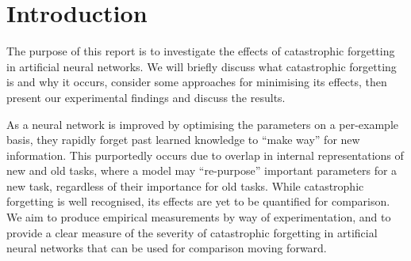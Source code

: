 \documentclass{report}
\begin{document}
	\section{Introduction}
	The purpose of this report is to investigate the effects of catastrophic forgetting in artificial neural networks. We will briefly discuss what catastrophic forgetting is and why it occurs, consider some approaches for minimising its effects, then present our experimental findings and discuss the results. \par \par
	As a neural network is improved by optimising the parameters on a per-example basis, they rapidly forget past learned knowledge to ``make way'' for new information. This purportedly occurs due to overlap in internal representations of new and old tasks, where a model may ``re-purpose'' important parameters for a new task, regardless of their importance for old tasks. While catastrophic forgetting is well recognised, its effects are yet to be quantified for comparison. We aim to produce empirical measurements by way of experimentation, and to provide a clear measure of the severity of catastrophic forgetting in artificial neural networks that can be used for comparison moving forward. \par
	
\end{document}
